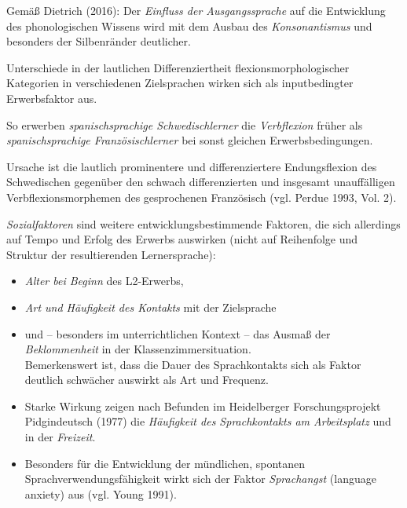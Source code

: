\documentclass[
  letterpaper,
]{scrbook}
\providecommand{\tightlist}{%
  \setlength{\itemsep}{0pt}\setlength{\parskip}{0pt}}\usepackage{longtable,booktabs,array}
\begin{document}
Gemäß Dietrich (2016): Der \emph{Einfluss der Ausgangssprache} auf die
Entwicklung des phonologischen Wissens wird mit dem Ausbau des
\emph{Konsonantismus} und besonders der Silbenränder deutlicher.

Unterschiede in der lautlichen Differenziertheit flexionsmorphologischer
Kategorien in verschiedenen Zielsprachen wirken sich als inputbedingter
Erwerbsfaktor aus.

\begin{tcolorbox}[enhanced jigsaw, arc=.35mm, left=2mm, bottomrule=.15mm, toprule=.15mm, colframe=quarto-callout-note-color-frame, breakable, rightrule=.15mm, opacityback=0, colback=white, leftrule=.75mm]
\begin{minipage}[t]{5.5mm}
\textcolor{quarto-callout-note-color}{\faInfo}
\end{minipage}%
\begin{minipage}[t]{\textwidth - 5.5mm}

So erwerben \emph{spanischsprachige Schwedischlerner} die
\emph{Verbflexion} früher als \emph{spanischsprachige Französischlerner}
bei sonst gleichen Erwerbsbedingungen.

Ursache ist die lautlich prominentere und differenziertere
Endungsflexion des Schwedischen gegenüber den schwach differenzierten
und insgesamt unauffälligen Verbflexionsmorphemen des gesprochenen
Französisch (vgl. Perdue 1993, Vol. 2).

\end{minipage}%
\end{tcolorbox}

\emph{Sozialfaktoren} sind weitere entwicklungsbestimmende Faktoren, die
sich allerdings auf Tempo und Erfolg des Erwerbs auswirken (nicht auf
Reihenfolge und Struktur der resultierenden Lernersprache):

\begin{itemize}
\tightlist
\item
  \emph{Alter bei Beginn} des L2-Erwerbs,\\
\item
  \emph{Art und Häufigkeit des Kontakts} mit der Zielsprache\\
\item
  und -- besonders im unterrichtlichen Kontext -- das Ausmaß der
  \emph{Beklommenheit} in der Klassenzimmersituation.\\
  Bemerkenswert ist, dass die Dauer des Sprachkontakts sich als Faktor
  deutlich schwächer auswirkt als Art und Frequenz.\\
\item
  Starke Wirkung zeigen nach Befunden im Heidelberger Forschungsprojekt
  Pidgindeutsch (1977) die \emph{Häufigkeit des Sprachkontakts am
  Arbeitsplatz} und in der \emph{Freizeit}.\\
\item
  Besonders für die Entwicklung der mündlichen, spontanen
  Sprachverwendungsfähigkeit wirkt sich der Faktor \emph{Sprachangst}
  (language anxiety) aus (vgl. Young 1991).
\end{itemize}
\end{document}
